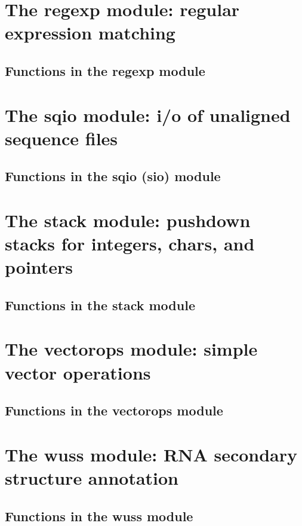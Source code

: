 \documentclass[11pt]{book}
\begin{document}
\newpage
\section{The regexp module: regular expression matching}

\subsection{Functions in the regexp module}


\newpage
\section{The sqio module: i/o of unaligned sequence files}

\subsection{Functions in the sqio (sio) module}


\newpage
\section{The stack module: pushdown stacks for integers, chars, and pointers}

\subsection{Functions in the stack module}


\newpage
\section{The vectorops module: simple vector operations}

\subsection{Functions in the vectorops module}


\newpage
\section{The wuss module: RNA secondary structure annotation}

\subsection{Functions in the wuss module}

\end{document}
